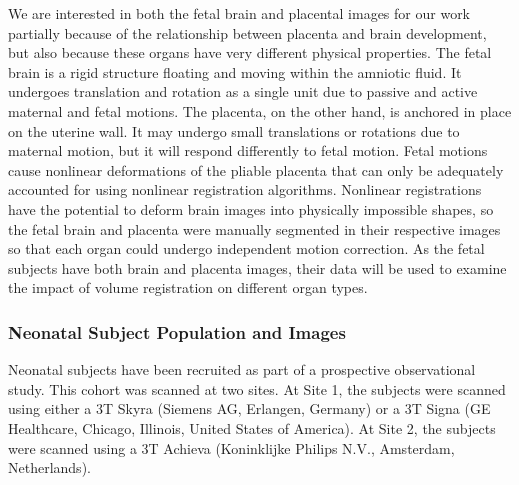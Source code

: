 We are interested in both the fetal brain and placental images for our work partially because of the relationship between placenta and brain development, but also because these organs have very different physical properties. The fetal brain is a rigid structure floating and moving within the amniotic fluid. It undergoes translation and rotation as a single unit due to passive and active maternal and fetal motions. The placenta, on the other hand, is anchored in place on the uterine wall. It may undergo small translations or rotations due to maternal motion, but it will respond differently to fetal motion. Fetal motions cause nonlinear deformations of the pliable placenta that can only be adequately accounted for using nonlinear registration algorithms. Nonlinear registrations have the potential to deform brain images into physically impossible shapes, so the fetal brain and placenta were manually segmented in their respective images so that each organ could undergo independent motion correction. As the fetal subjects have both brain and placenta images, their data will be used to examine the impact of volume registration on different organ types.


\subsubsection{Neonatal Subject Population and Images}

Neonatal subjects have been recruited as part of a prospective observational study. This cohort was scanned at two sites. At Site 1, the subjects were scanned using either a 3T Skyra (Siemens AG, Erlangen, Germany) or a 3T Signa (GE Healthcare, Chicago, Illinois, United States of America). At Site 2, the subjects were scanned using a 3T Achieva (Koninklijke Philips N.V., Amsterdam, Netherlands).

